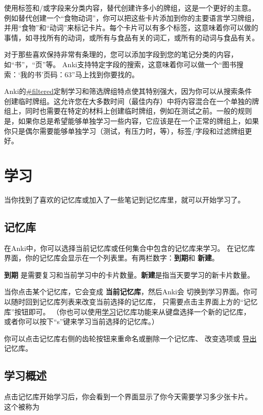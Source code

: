 \documentclass[a4paper]{book}
\begin{document}
	使用标签和/或字段来分类内容，替代创建许多小的牌组，这是一个更好的主意。例如替代创建一个“食物动词”，你可以把这些卡片添加到你的主要语言学习牌组，并用“食物”和“动词”来标记卡片。每个卡片可以有多个标签，这意味着你可以做的事情，如寻找所有的动词，或所有与食品有关的词汇，或所有的动词与食品有关。
	
	对于那些喜欢保持非常有条理的，您可以添加字段到您的笔记分类的内容，如“书”，“页”等。 Anki支持特定字段的搜索，这意味着你可以做一个“图书搜索：‘我的书’页码：63”马上找到你要找的。
	
	Anki的\url{#filtered}定制学习和筛选牌组特点使其特别强大，因为你可以从搜索条件创建临时牌组。这允许您在大多数时间（最佳内存）中将内容混合在一个单独的牌组上，同时也需要在特定的材料上创建临时牌组，例如在测试之前。一般的规则是，如果你总是希望能够单独学习一些内容，它应该是在一个正常的牌组上，如果你只是偶尔需要能够单独学习（测试，有压力时，等），标签/字段和过滤牌组更好。
	
	\chapter{学习}\label{studydeck}
	
	当你找到了喜欢的记忆库或加入了一些笔记到记忆库里，就可以开始学习了。
	
	\section{记忆库}\label{deckoverview}
	
	在Anki中，你可以选择当前记忆库或任何集合中包含的记忆库来学习。
	在记忆库界面，你的记忆库会显示在一个列表里。有两栏数字：\textbf{到期}和 \textbf{新建}。
	
	\textbf{到期} 是需要复习和当前学习中的卡片数量。\textbf{新建}是指当天要学习的新卡片数量。
	
	当你点击某个记忆库，它会变成 \textbf{当前记忆库}，然后Anki会 切换到学习界面。你可以随时回到记忆库列表来改变当前选择的记忆库， 只需要点击主界面上方的“记忆库”按钮即可。 （你也可以使用\hyperref[studydeck]{学习}记忆库功能来从键盘选择一个新的记忆库， 或者你可以按下“s”键来学习当前选择的记忆库。）
	
	你可以点击记忆库右侧的齿轮按钮来重命名或删除一个记忆库、 改变选项或
	\hyperref[exporting]{导出}记忆库。
	
	\section{学习概述}
	
	点击记忆库开始学习后，你会看到一个界面显示了你今天需要学习多少张卡片。 这个被称为
	
\end{document}
